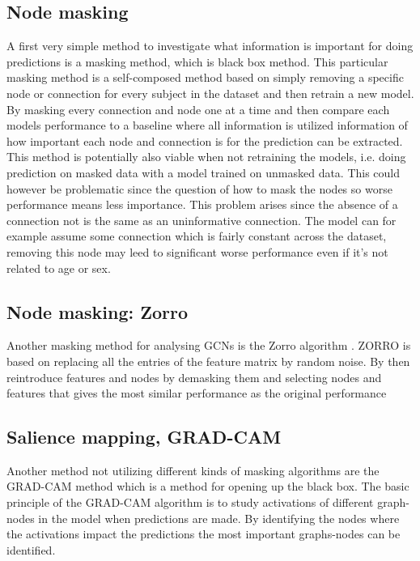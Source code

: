 \subsection{Node masking}
A first very simple method to investigate what information is important  for doing predictions is a masking method, which is black box method. This particular masking method is a self-composed method based on simply removing a specific node or connection for every subject in the dataset and then retrain a new model. By masking every connection and node one at a time and then compare each models performance to a baseline where all information is utilized information of how important each node and connection is for the prediction can be extracted. This method is potentially also viable when not retraining the models, i.e. doing prediction on masked data with a model trained on unmasked data. This could however be problematic since the question of how to mask the nodes so worse performance means less importance. This problem arises since the absence of a connection not is the same as an uninformative connection. The model can for example assume some connection which is fairly constant across the dataset, removing this node may leed to significant worse performance even if it's not related to age or sex.

\subsection{Node masking: Zorro}
Another masking method for analysing GCNs is the Zorro algorithm \cite{}. ZORRO is based on replacing all the entries of the feature matrix by random noise. By then reintroduce features and nodes by demasking them and selecting nodes and features that gives the most similar performance as the original performance 

\subsection{Salience mapping, GRAD-CAM}
Another method not utilizing different kinds of masking algorithms are the GRAD-CAM method which is a method for opening up the black box. The basic principle of the GRAD-CAM algorithm is to study activations of different graph-nodes in the model when predictions are made. By identifying the nodes where the activations impact the predictions the most important graphs-nodes can be identified. 

